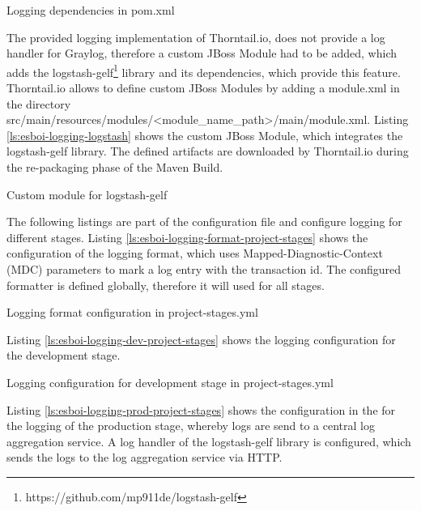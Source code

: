 \begin{listing}[h]
	\caption{Logging dependencies in pom.xml}
	\label{ls:esboi-logging-pom}
\end{listing}

The provided logging implementation of Thorntail.io, does not provide a log handler for Graylog, therefore a custom JBoss Module had to be added, which adds the logstash-gelf\footnote{https://github.com/mp911de/logstash-gelf} library and its dependencies, which provide this feature. Thorntail.io allows to define custom JBoss Modules by adding a module.xml in the directory src/main/resources/modules/<module\_name\_path>/main/module.xml. Listing \vref{ls:esboi-logging-logstash} shows the custom JBoss Module, which integrates the logstash-gelf library. The defined artifacts are downloaded by Thorntail.io during the re-packaging phase of the Maven Build.

\begin{listing}[h]
	\caption{Custom module for logstash-gelf}
	\label{ls:esboi-logging-logstash}
\end{listing}

The following listings are part of the  configuration file and configure logging for different stages. Listing \vref{ls:esboi-logging-format-project-stages} shows the configuration of the logging format, which uses Mapped-Diagnostic-Context (MDC) parameters to mark a log entry with the transaction id. The configured formatter is defined globally, therefore it will used for all stages.

\begin{listing}[h]
	\caption{Logging format configuration in project-stages.yml}
	\label{ls:esboi-logging-format-project-stages}
\end{listing}

Listing \vref{ls:esboi-logging-dev-project-stages} shows the logging configuration for the development stage.
\newpage

\begin{listing}[h]
	\caption{Logging configuration for development stage in project-stages.yml}
	\label{ls:esboi-logging-dev-project-stages}
\end{listing}

Listing \vref{ls:esboi-logging-prod-project-stages} shows the configuration in the  for the logging of the production stage, whereby logs are send to a central log aggregation service. A log handler of the logstash-gelf library is configured, which sends the logs to the log aggregation service via HTTP.

